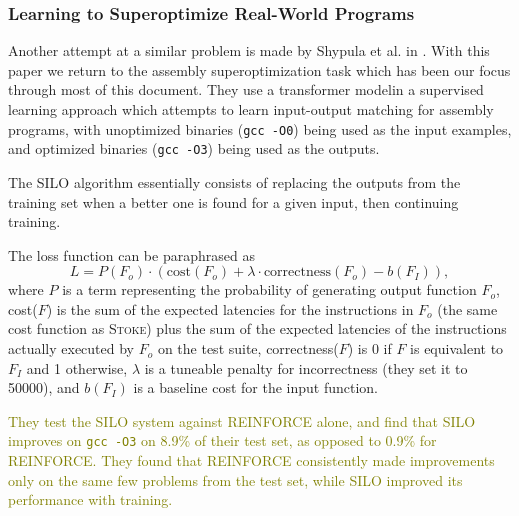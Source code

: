 \documentclass[12pt,twoside]{reedthesis}
\newcommand{\green}[1]{\textcolor{olive}{#1}}
\begin{document}

    \subsubsection{Learning to Superoptimize Real-World Programs}
        Another attempt at a similar problem is made by Shypula et al. in \cite{shypula2022learning}.
        With this paper we return to the assembly superoptimization task which has been our focus through most of this document. 
        They use a transformer model\footnotemark in a supervised learning approach which attempts to learn input-output matching for assembly programs, with unoptimized binaries (\texttt{gcc -O0}) being used as the input examples, and optimized binaries (\texttt{gcc -O3}) being used as the outputs.
        
            
        The SILO algorithm essentially consists of replacing the outputs from the training set when a better one is found for a given input, then continuing training.
            
        The loss function can be paraphrased as 
        \[ L = P(F_o) \cdot (\text{cost}(F_o) + \lambda \cdot \text{correctness}(F_o) - b(F_I)), \]
        where $P$ is a term representing the probability of generating output function $F_o$, cost($F$) is the sum of the expected latencies for the instructions in $F_o$ (the same cost function as \textsc{Stoke}) plus the sum of the expected latencies of the instructions actually executed by $F_o$ on the test suite, correctness($F$) is 0 if $F$ is equivalent to $F_I$ and 1 otherwise, $\lambda$ is a tuneable penalty for incorrectness (they set it to 50000), and $b(F_I)$ is a baseline cost for the input function.
        
        \green{
        They test the SILO system against REINFORCE alone, and find that SILO improves on \texttt{gcc -O3} on 8.9\% of their test set, as opposed to 0.9\% for REINFORCE.
        They found that REINFORCE consistently made improvements only on the same few problems from the test set, while SILO improved its performance with training.
        }
\end{document}
